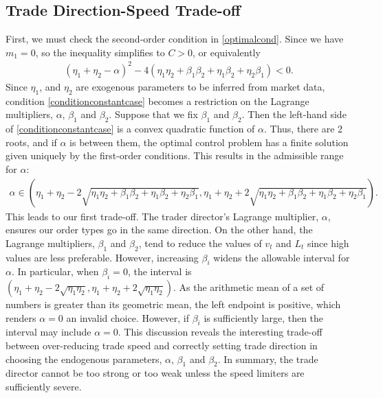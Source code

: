 \documentclass[12pt, letterpaper]{article}
\numberwithin{equation}{section}
\numberwithin{theorem}{section}
\begin{document}
\subsection{Trade Direction-Speed   Trade-off}\label{sec:lagrange}
First,  we must check   the second-order  condition in \eqref{optimalcond}. Since we have $m_1=0$, so the inequality  simplifies to $C>0$, or equivalently
\begin{equation}
\begin{aligned}\label{conditionconstantcase}
\left(\eta_1+\eta_2-\alpha\right)^2-4(\eta_1\eta_2+\beta_1\beta_2+\eta_1\beta_2+\eta_2\beta_1)<0.
\end{aligned}
\end{equation}
Since $\eta_1$, and $\eta_2$ are exogenous parameters to be inferred from market data,    condition \eqref{conditionconstantcase} becomes a restriction on the Lagrange multipliers, $\alpha$, $\beta_1$ and $\beta_2$. Suppose that we fix $\beta_1$ and $\beta_2$. Then the left-hand side  of \eqref{conditionconstantcase} is a convex quadratic function of $\alpha$. Thus, there are 2 roots, and if $\alpha$ is between them, the optimal control problem has a finite solution given uniquely by the first-order conditions. This results in the admissible range for $\alpha$:
\begin{equation}
\begin{aligned}
\alpha\in\left(\eta_1+\eta_2-2\sqrt{\eta_1\eta_2+\beta_1\beta_2+\eta_1\beta_
	2+\eta_2\beta_1},\eta_1+\eta_2+2\sqrt{\eta_1\eta_2+\beta_1\beta_2+\eta_1\beta_2+\eta_2\beta_1}\right).
\end{aligned}
\end{equation}
This leads to our first trade-off. The trader director's Lagrange multiplier, $\alpha$, ensures our order types go in the same direction. On the other hand, the Lagrange multipliers, $\beta_1$ and $\beta_2$, tend to reduce the values of $v_t$ and $L_t$ since high values are less preferable. However, increasing $\beta_i$ widens the allowable interval for $\alpha$. In particular, when $\beta_i=0$, the interval is $\left(\eta_1+\eta_2-2\sqrt{\eta_1\eta_2},\eta_1+\eta_2+2\sqrt{\eta_1\eta_2}\right)$. As the arithmetic mean of a set of numbers is greater than its geometric mean, the left endpoint is positive, which renders  $\alpha=0$ an invalid choice. However, if $\beta_i$ is sufficiently large, then the  interval may include $\alpha=0$. This  discussion reveals the interesting     trade-off between over-reducing trade speed and correctly setting trade direction in  choosing the endogenous parameters, $\alpha$, $\beta_1$ and $\beta_2$. In summary, the  trade director cannot be too strong or too weak unless the speed limiters are sufficiently severe. 
\end{document}
